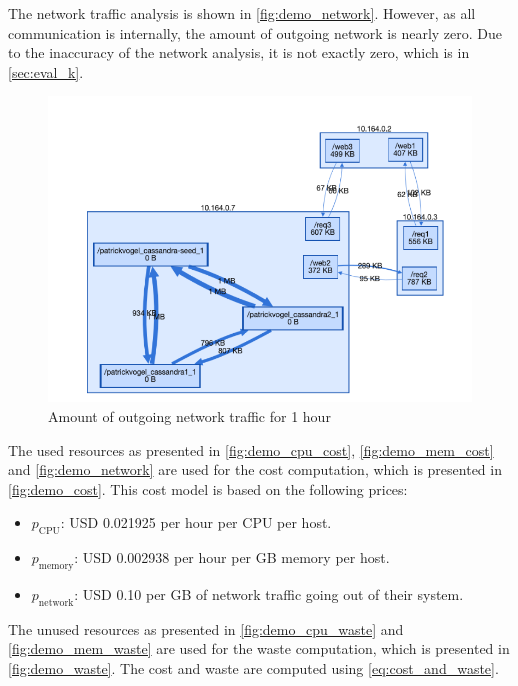 \noindent
The network traffic analysis is shown in \autoref{fig:demo_network}. However, as all communication is internally, the amount of outgoing network is nearly zero. Due to the inaccuracy of the network analysis, it is not exactly zero, which is in \autoref{sec:eval_k}.\\

\begin{figure}
    \centering
    \includegraphics[width=\textwidth]{gfx/demo_network}
    \caption{Amount of outgoing network traffic for 1 hour}
    \label{fig:demo_network}
\end{figure}

\noindent
The used resources as presented in \autoref{fig:demo_cpu_cost}, \autoref{fig:demo_mem_cost} and \autoref{fig:demo_network} are used for the cost computation, which is presented in \autoref{fig:demo_cost}. This cost model is based on the following prices:
\begin{itemize}
    \item $p_\text{CPU}$: USD 0.021925 per hour per CPU per host.
    \item $p_\text{memory}$: USD 0.002938 per hour per GB memory per host.
    \item $p_\text{network}$: USD 0.10 per GB of network traffic going out of their system.
\end{itemize}

\noindent
The unused resources as presented in \autoref{fig:demo_cpu_waste} and \autoref{fig:demo_mem_waste} are used for the waste computation, which is presented in \autoref{fig:demo_waste}. The cost and waste are computed using \autoref{eq:cost_and_waste}.\\

